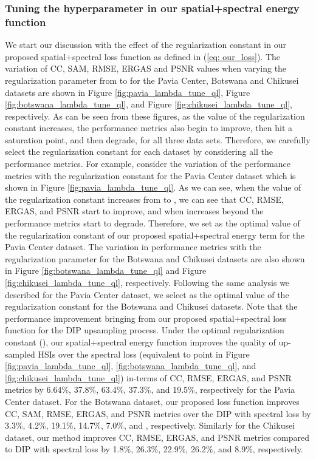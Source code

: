 \documentclass[journal]{IEEEtran}
\begin{document}
    \subsubsection{Tuning the hyperparameter  in our spatial+spectral energy function} 
    \par We start our discussion with the effect of the regularization constant  in our proposed spatial+spectral loss function as defined in (\ref{eq: our_loss}). The variation of CC, SAM, RMSE, ERGAS and PSNR values when varying the regularization parameter  from  to  for the Pavia Center, Botswana and Chikusei datasets are shown in Figure \ref{fig:pavia_lambda_tune_ql}, Figure \ref{fig:botswana_lambda_tune_ql}, and Figure \ref{fig:chikusei_lambda_tune_ql}, respectively. As can be seen from these figures, as the value of the regularization constant  increases, the performance metrics also begin to improve, then hit a saturation point, and then degrade, for all three data sets. Therefore, we carefully select the regularization constant  for each dataset by considering all the performance metrics. For example, consider the variation of the performance metrics with the regularization constant  for the Pavia Center dataset which is shown in Figure \ref{fig:pavia_lambda_tune_ql}. As we can see, when the value of the regularization constant increases from  to , we can see that CC, RMSE, ERGAS, and PSNR start to improve, and when  increases beyond  the performance metrics start to degrade. Therefore, we set  as the optimal value of the regularization constant of our proposed spatial+spectral energy term for the Pavia Center dataset. The variation in performance metrics with the regularization parameter  for the Botswana and Chikusei datasets are also shown in Figure \ref{fig:botswana_lambda_tune_ql} and Figure \ref{fig:chikusei_lambda_tune_ql}, respectively. Following the same analysis we described for the Pavia Center dataset, we select  as the optimal value of the regularization constant for the Botswana and Chikusei datasets. Note that the performance improvement bringing from our proposed spatial+spectral loss function for the DIP upsampling process. Under the optimal regularization constant (), our spatial+spectral energy function improves the quality of up-sampled HSIs over the spectral loss (equivalent to  point in Figure \ref{fig:pavia_lambda_tune_ql}, \ref{fig:botswana_lambda_tune_ql}, and \ref{fig:chikusei_lambda_tune_ql}) in-terms of CC, RMSE, ERGAS, and PSNR metrics by 6.64\%,  37.8\%, 63.4\%, 37.3\%, and 19.5\%, respectively for the Pavia Center dataset. For the Botswana dataset, our proposed loss function improves CC, SAM, RMSE, ERGAS, and PSNR metrics over the DIP with spectral loss by 3.3\%,  4.2\%, 19.1\%, 14.7\%, 7.0\%, and , respectively. Similarly for the Chikusei dataset, our method improves CC, RMSE, ERGAS, and PSNR metrics compared to  DIP with spectral loss by 1.8\%,  26.3\%, 22.9\%, 26.2\%, and 8.9\%, respectively.
    
\end{document}
